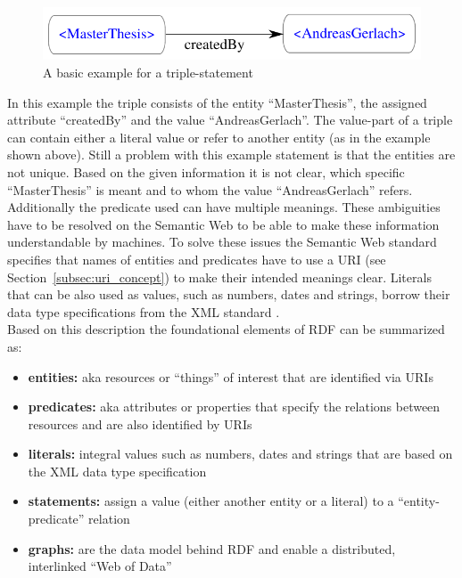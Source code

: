 \begin{figure}[H]
	\centering
		\includegraphics[width=0.8\columnwidth]{images/sample_triple.pdf}
	\caption{A basic example for a triple-statement}
\label{fig:images_semweb_triple}
\end{figure}

In this example the triple consists of the entity ``MasterThesis'', the assigned attribute ``createdBy'' and the value ``AndreasGerlach''. The value-part of a triple can contain either a literal value or refer to another entity (as in the example shown above). Still a problem with this example statement is that the entities are not unique. Based on the given information it is not clear, which specific ``MasterThesis'' is meant and to whom the value ``AndreasGerlach'' refers. Additionally the predicate used can have multiple meanings. These ambiguities have to be resolved on the Semantic Web to be able to make these information understandable by machines. To solve these issues the Semantic Web standard specifies that names of entities and predicates have to use a \gls{URI} (see Section~\ref{subsec:uri_concept}) to make their intended meanings clear. Literals that can be also used as values, such as numbers, dates and strings, borrow their data type specifications from the \gls{XML} standard \citep[pg. 15-38]{wood2014linked}. \\

Based on this description the foundational elements of \gls{RDF} can be summarized as: \@

\begin{itemize}
	\item \textbf{entities:} aka resources or ``things'' of interest that are identified via \gls{URI}s
	\item \textbf{predicates:} aka attributes or properties that specify the relations between resources and are also identified by \gls{URI}s
	\item \textbf{literals:} integral values such as numbers, dates and strings that are based on the \gls{XML} data type specification
	\item \textbf{statements:} assign a value (either another entity or a literal) to a ``entity-predicate'' relation
	\item \textbf{graphs:} are the data model behind \gls{RDF} and enable a  distributed, interlinked ``Web of Data''
\end{itemize}

